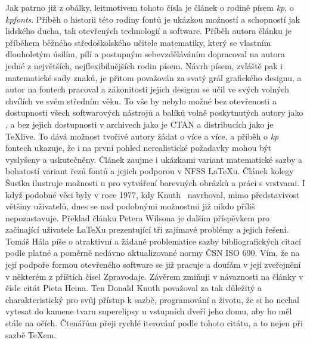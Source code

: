 Jak patrno již z obálky, leitmotivem tohoto čísla je článek o rodině písem \emph{kp}, o \emph{kpfonts}.  Příběh o historii této rodiny fontů je ukázkou možností a schopností jak lidského ducha, tak otevřených technologií a software.
Příběh autora článku je příběhem běžného středoškolského učitele matematiky, který se vlastním dlouholetým úsilím, pílí a postupným sebevzděláváním dopracoval na autora jedné z největších, nejflexibilnějších rodin písem.  Návrh písem, zvláště pak i matematické sady znaků, je přitom považován za svatý grál grafického designu, a autor na fontech pracoval a zákonitosti jejich designu se učil ve svých volných chvílích ve svém středním věku.  To vše by nebylo možné bez otevřenosti a dostupnosti všech softwarových nástrojů a balíků volně poskytnutých autory jako , a bez jejich dostupnosti v archivech jako je CTAN a distribucích jako je \TeX live.  To dává možnost tvořivé autory žádat o více a více, a příběh o \emph{kp} fontech ukazuje, že i na první pohled nerealistické požadavky mohou být vyslyšeny a uskutečněny.
Článek zaujme i ukázkami variant matematické sazby a bohatostí variant řezů fontů a jejich podporou v NFSS \LaTeX u.
Článek kolegy Šustka ilustruje možnosti \MF u pro vytváření barevných obrázků a práci s vrstvami.  I když podobné věci byly v roce 1977, kdy Knuth \MF\ navrhoval, mimo představivost většiny uživatelů, dnes se nad podobnými možnostmi již nikdo příliš nepozastavuje.
Překlad článku Petera Wilsona je dalším příspěvkem pro začínající uživatele \LaTeX u prezentující tři zajímavé problémy a jejich řešení.
Tomáš Hála píše o atraktivní a žádané problematice sazby bibliografických citací podle platné a poměrně nedávno aktualizované normy ČSN ISO 690.  Vím, že na její podpoře formou otevřeného software se již pracuje a doufám v její zveřejnění v některém z příštích čísel Zpravodaje.
Závěrem zmiňuji v návaznosti na články v čísle citát Pieta Heina.  Ten Donald Knuth považoval za tak důležitý a charakteristický pro svůj přístup k sazbě, programování a životu, že si ho nechal vytesat do kamene tvaru superelipsy u vstupních dveří jeho domu, aby ho měl stále na očích. Čtenářům přeji rychlé iterování podle tohoto citátu, a to nejen při sazbě \TeX em.
